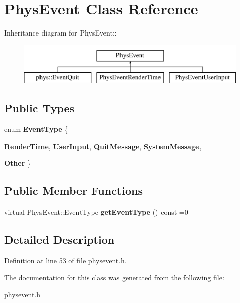 \hypertarget{classPhysEvent}{
\section{PhysEvent Class Reference}
\label{d9/dc2/classPhysEvent}
}
Inheritance diagram for PhysEvent::\begin{figure}[H]
\begin{center}
\leavevmode
\includegraphics[height=2cm]{d9/dc2/classPhysEvent}
\end{center}
\end{figure}
\subsection*{Public Types}
\begin{DoxyCompactItemize}
\item 
enum {\bfseries EventType} \{ \par
{\bfseries RenderTime}, 
{\bfseries UserInput}, 
{\bfseries QuitMessage}, 
{\bfseries SystemMessage}, 
\par
{\bfseries Other}
 \}
\end{DoxyCompactItemize}
\subsection*{Public Member Functions}
\begin{DoxyCompactItemize}
\item 
\hypertarget{classPhysEvent_aca0328653fffcc9b1072b290074f29c0}{
virtual PhysEvent::EventType {\bfseries getEventType} () const =0}
\label{d9/dc2/classPhysEvent_aca0328653fffcc9b1072b290074f29c0}

\end{DoxyCompactItemize}


\subsection{Detailed Description}


Definition at line 53 of file physevent.h.

The documentation for this class was generated from the following file:\begin{DoxyCompactItemize}
\item 
physevent.h\end{DoxyCompactItemize}

